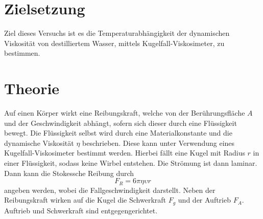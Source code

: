 \section{Zielsetzung}
Ziel dieses Versuchs ist es die Temperaturabhängigkeit der dynamischen Viskosität von destilliertem Wasser, mittels Kugelfall-Viskosimeter, zu bestimmen.
\section{Theorie}
\label{sec:Theorie}
Auf einen Körper wirkt eine Reibungskraft, welche von der Berührungsfläche $A$ und der Geschwindigkeit abhängt, sofern sich dieser durch eine Flüssigkeit bewegt.
Die Flüssigkeit selbst wird durch eine Materialkonstante und die dynamische Viskosität $\eta$ beschrieben.
Diese kann unter Verwendung eines Kugelfall-Viskosimeter bestimmt werden.
Hierbei fällt eine Kugel mit Radius $r$ in einer Flüssigkeit, sodass keine Wirbel entstehen.
Die Strömung ist dann laminar.
Dann kann die Stokessche Reibung durch
\begin{equation}
  F_R = 6 \pi \eta \upsilon r
\end{equation}
angeben werden, wobei \upsilon die Fallgeschwindigkeit darstellt.
Neben der Reibungskraft wirken auf die Kugel die Schwerkraft $F_g$ und der Auftrieb $F_A$.
Auftrieb und Schwerkraft sind entgegengerichtet.
